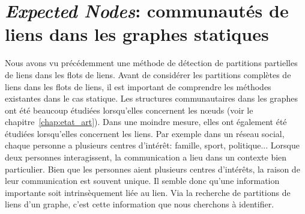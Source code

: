 \chapter{\emph{Expected Nodes}: communautés de liens dans les graphes statiques}
\minitoc

\label{chap:Expected_Node}
Nous avons vu précédemment une méthode de détection de partitions partielles de liens dans les flots de liens.
Avant de considérer les partitions complètes de liens dans les flots de liens, il est important de comprendre les méthodes existantes dans le cas statique.
Les structures communautaires dans les graphes ont été beaucoup étudiées lorsqu'elles concernent les n\oe{}uds (voir le chapitre~\ref{chap:etat_art}).
Dans une moindre mesure, elles ont également été étudiées lorsqu'elles concernent les liens.
Par exemple dans un réseau social, chaque personne a plusieurs centres d'intérêt: famille, sport, politique...
Lorsque deux personnes interagissent, la communication a lieu dans un contexte bien particulier.
Bien que les personnes aient plusieurs centres d'intérêts, la raison de leur communication est souvent unique.
Il semble donc qu'une information importante soit intrinsèquement liée au lien.
Via la recherche de partitions de liens d'un graphe, c'est cette information que nous cherchons à identifier.

